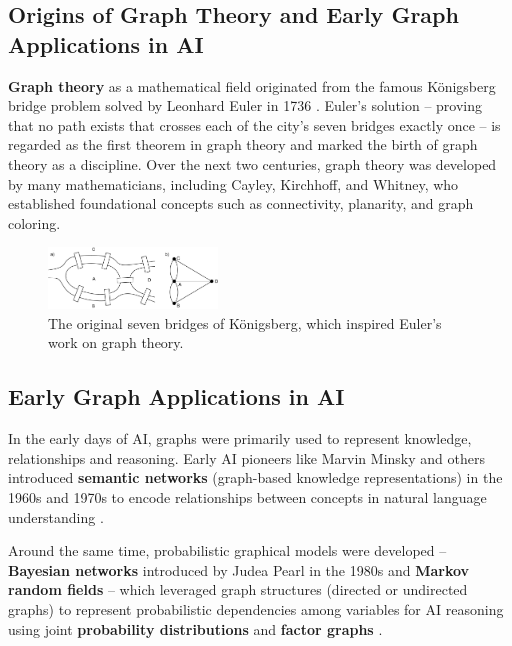 \documentclass{article}
\begin{document}
\subsection{Origins of Graph Theory and Early Graph Applications in AI}

\textbf{Graph theory} as a mathematical field originated from the famous Königsberg bridge problem solved by Leonhard Euler in 1736 \cite{carlson2019konigsberg}.
Euler’s solution – proving that no path exists that crosses each of the city’s seven bridges exactly once – is regarded as the first theorem in graph theory and marked the birth of graph theory as a discipline.
Over the next two centuries, graph theory was developed by many mathematicians, including Cayley, Kirchhoff, and Whitney, who established foundational concepts such as connectivity, planarity, and graph coloring.

\begin{figure}[h]
      \centering
      \includegraphics[width=0.4\textwidth]{../assets/konigsberg-bridges.png}
      \caption{The original seven bridges of Königsberg, which inspired Euler's work on graph theory.}
      \label{fig:konigsberg-bridges}
\end{figure}

\subsection{Early Graph Applications in AI}

In the early days of AI, graphs were primarily used to represent knowledge, relationships and reasoning.
Early AI pioneers like Marvin Minsky and others introduced \textbf{semantic networks} (graph-based knowledge representations) in the 1960s and 1970s to encode relationships between concepts in natural language understanding \cite{kelemen2007neural}.

Around the same time, probabilistic graphical models were developed – \textbf{Bayesian networks} introduced by Judea Pearl in the 1980s \cite{pearl1995bayesian} and \textbf{Markov random fields} \cite{lang2024abstract} – which leveraged graph structures (directed or undirected graphs) to represent probabilistic dependencies among variables for AI reasoning using joint \textbf{probability distributions} and \textbf{factor graphs} \cite{loeliger2004factor}.
\end{document}
